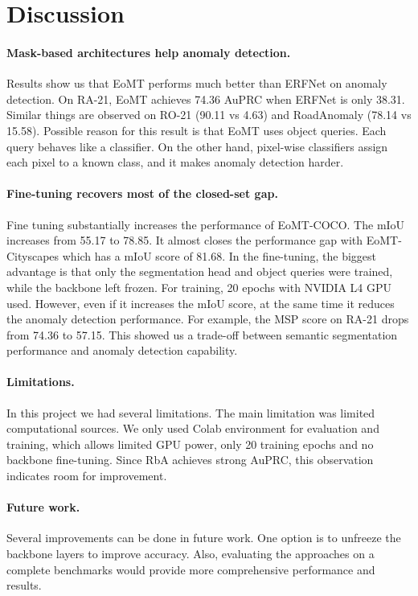 \section{Discussion}
\label{sec:discussion}

\paragraph{Mask-based architectures help anomaly detection.}

Results show us that EoMT performs much better than ERFNet on anomaly detection.
On RA-21, EoMT achieves 74.36 AuPRC when ERFNet is only 38.31.
Similar things are observed on RO-21 (90.11 vs 4.63) and RoadAnomaly (78.14 vs 15.58).
Possible reason for this result is that EoMT uses object queries. Each query behaves like a classifier.
On the other hand, pixel-wise classifiers assign each pixel to a known class, and it makes anomaly detection harder.

\paragraph{Fine-tuning recovers most of the closed-set gap.}

Fine tuning substantially increases the performance of EoMT-COCO. 
The mIoU increases from 55.17 to 78.85. It almost closes the performance gap with EoMT-Cityscapes which has a mIoU score of 81.68.
In the fine-tuning, the biggest advantage is that only the segmentation head and object queries were trained, while the backbone left frozen.
For training, 20 epochs with NVIDIA L4 GPU used. However, even if it increases the mIoU score, at the same time it reduces the anomaly detection performance.
For example, the MSP score on RA-21 drops from 74.36 to 57.15. 
This showed us a trade-off between semantic segmentation performance and anomaly detection capability.

\paragraph{Limitations.}

In this project we had several limitations. The main limitation was limited computational sources. 
We only used Colab environment for evaluation and training, which allows limited GPU power, only 20 training epochs and no backbone fine-tuning.
Since RbA achieves strong AuPRC, this observation indicates room for improvement.

\paragraph{Future work.}

Several improvements can be done in future work. One option is to unfreeze the backbone layers to improve accuracy. 
Also, evaluating the approaches on a complete benchmarks would provide more comprehensive performance and results.
